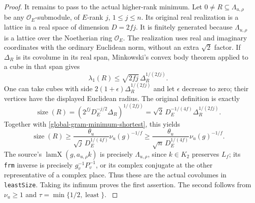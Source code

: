 \begin{proof}
It remains to pass to the actual higher-rank minimum.  Let
$0\ne R\subseteq\Lambda_{u,\rho}$ be any
$\mathcal O_E$-submodule, of $E$-rank $j$, $1\le j\le n$.
Its original real realization is a lattice in a real space
of dimension $D=2fj$.  It is finitely generated because
$\Lambda_{u,\rho}$ is a lattice over the Noetherian ring
$\mathcal O_E$.  The realization uses real and imaginary
coordinates with the ordinary Euclidean norm, without an
extra $\sqrt2$ factor.  If $\Delta_R$ is its covolume in its
real span, Minkowski's convex body theorem applied to a cube
in that span gives
\[
 \lambda_1(R)\le\sqrt{2fj}\,\Delta_R^{1/(2fj)}.
\]
One can take cubes with side $2(1+\epsilon)\Delta_R^{1/(2fj)}$
and let $\epsilon$ decrease to zero; their vertices have the
displayed Euclidean radius.  The original definition is exactly
\[
 \operatorname{size}(R)
    =\left(2^{fj}D_E^{-j/2}\Delta_R\right)^{1/(2fj)}
    =\sqrt2\,D_E^{-1/(4f)}\Delta_R^{1/(2fj)}.
\]
Together with \eqref{global-gram-minimum-shortest}, this yields
\[
 \operatorname{size}(R)\ge
     \frac{\theta_u}{\sqrt j\,D_E^{1/(4f)}}\nu_u(g)^{-1/f}
 \ge\frac{\theta_u}{\sqrt n\,D_E^{1/(4f)}}\nu_u(g)^{-1/f}.
\]
The source's $\operatorname{lamX}(g,a_{u,\rho}k)$ is precisely
$\Lambda_{u,\rho}$, since $k\in K_2$ preserves $L_f$; its
\texttt{frm} inverse is precisely $g_v^{-1}P_v^{-1}$, or its
complex conjugate at the other representative of a complex
place.  Thus these are the actual covolumes in
\texttt{leastSize}.  Taking its infimum proves the first
assertion.  The second follows from $\nu_u\ge1$ and
$\tau=\min\{1/2,\operatorname{least}\}$.
\cite{global-gram-minimum-source}
\end{proof}

